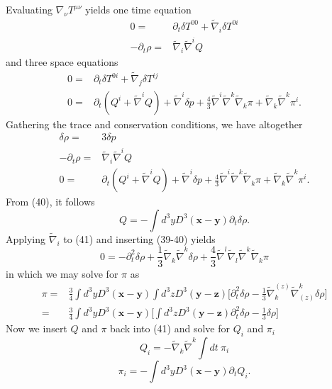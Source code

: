 \documentclass[10pt,letterpaper]{article}
\begin{document}
Evaluating $\nabla_\nu T^{\mu\nu}$ yields one time equation
\begin{align}
0=&{}\partial_t \delta T^{00} + \tilde\nabla_i \delta T^{0i} \nonumber\\
-\partial_t\rho = &{} \tilde\nabla_i \tilde\nabla^i Q
\end{align}
and three space equations
\begin{align}
0=&{}\partial_t \delta T^{0i} + \tilde\nabla_j \delta T^{ij} \nonumber\\
0 = &{} \partial_t (Q^i + \tilde\nabla^i Q) + \tilde\nabla^i \delta p +\frac43 \tilde\nabla^i \tilde\nabla^k \tilde\nabla_k \pi + \tilde\nabla_k \tilde\nabla^k \pi^i.
\end{align}
Gathering the trace and conservation conditions, we have altogether
\begin{align}
 \delta \rho =&{} 3\delta p\\
-\partial_t\rho = &{} \tilde\nabla_i \tilde\nabla^i Q\\
0 = &{} \partial_t (Q^i + \tilde\nabla^i Q) + \tilde\nabla^i \delta p +\frac43 \tilde\nabla^i \tilde\nabla^k \tilde\nabla_k \pi + \tilde\nabla_k \tilde\nabla^k \pi^i.
\end{align}
From (40), it follows
\begin{equation}
Q = -\int d^3y D^3(\mathbf x-\mathbf y) \partial_t \delta \rho.
\end{equation}
Applying $\tilde\nabla_i$ to (41) and inserting (39-40) yields
\begin{equation}
	0 = -\partial_t^2 \delta \rho + \frac13 \tilde\nabla_k\tilde\nabla^k \delta\rho + \frac43 \tilde\nabla^l \tilde\nabla_l \tilde\nabla^k \tilde\nabla_k \pi
\end{equation}
in which we may solve for $\pi$ as
\begin{align}
\pi =&{} \frac34 \int d^3y D^3(\mathbf x-\mathbf y) \int d^3z D^3(\mathbf y-\mathbf z) \bigg[  \partial_t^2 \delta \rho - \frac13 \tilde\nabla_k^{(z)}\tilde\nabla^k_{(z)} \delta\rho
\bigg]\nonumber\\
=&{}  \frac34 \int d^3y D^3(\mathbf x-\mathbf y) \bigg[ \int d^3z D^3(\mathbf y-\mathbf z) \partial_t^2 \delta \rho - \frac13\delta\rho\bigg]
\end{align}
Now we insert $Q$ and $\pi$ back into (41) and solve for $Q_i$ and $\pi_i$
\begin{equation}
Q_i = - \tilde\nabla_k \tilde\nabla^k \int dt\  \pi_i 
\end{equation}
\begin{equation}
\pi_i = - \int d^3y D^3(\mathbf x-\mathbf y) \partial_t Q_i.
\end{equation}
\end{document}
